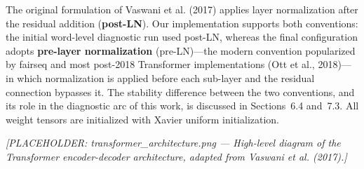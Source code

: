 The original formulation of Vaswani et al. (2017) applies layer normalization after the residual addition (\textbf{post-LN}). Our implementation supports both conventions: the initial word-level diagnostic run used post-LN, whereas the final configuration adopts \textbf{pre-layer normalization} (pre-LN)---the modern convention popularized by fairseq and most post-2018 Transformer implementations (Ott et al., 2018)---in which normalization is applied before each sub-layer and the residual connection bypasses it. The stability difference between the two conventions, and its role in the diagnostic arc of this work, is discussed in Sections~6.4 and~7.3. All weight tensors are initialized with Xavier uniform initialization.

\textit{[PLACEHOLDER: transformer\_architecture.png --- High-level diagram of the Transformer encoder-decoder architecture, adapted from Vaswani et al. (2017).]}
